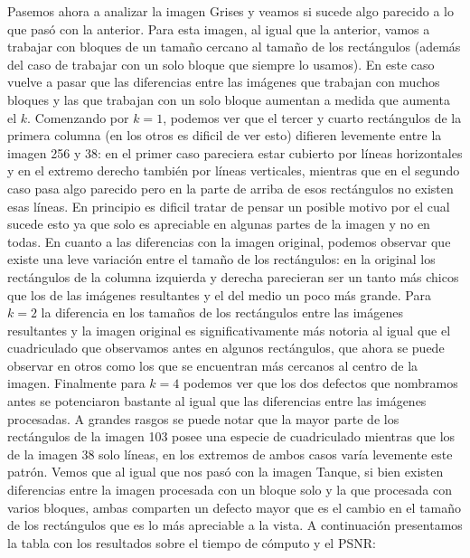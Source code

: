\documentclass[a4paper]{article}
\newcounter{col}
\begin{document}
Pasemos ahora a analizar la imagen Grises y veamos si sucede algo parecido a lo que pasó con la anterior. Para esta imagen, al igual que la anterior, vamos a trabajar con bloques de un tamaño cercano al tamaño de los rectángulos (además del caso de trabajar con un solo bloque que siempre lo usamos). En este caso vuelve a pasar que las diferencias entre las imágenes que trabajan con muchos bloques y las que trabajan con un solo bloque aumentan a medida que aumenta el $k$. Comenzando por $k = 1$, podemos ver que el tercer y cuarto rectángulos de la primera columna (en los otros es dificil de ver esto) difieren levemente entre la imagen 256 y 38: en el primer caso pareciera estar cubierto por líneas horizontales y en el extremo derecho también por líneas verticales, mientras que en el segundo caso pasa algo parecido pero en la parte de arriba de esos rectángulos no existen esas líneas. En principio es dificil tratar de pensar un posible motivo por el cual sucede esto ya que solo es apreciable en algunas partes de la imagen y no en todas. En cuanto a las diferencias con la imagen original, podemos observar que existe una leve variación entre el tamaño de los rectángulos: en la original los rectángulos de la columna izquierda y derecha parecieran ser un tanto más chicos que los de las imágenes resultantes y el del medio un poco más grande. Para $k = 2$ la diferencia en los tamaños de los rectángulos entre las imágenes resultantes y la imagen original es significativamente más notoria al igual que el cuadriculado que observamos antes en algunos rectángulos, que ahora se puede observar en otros como los que se encuentran más cercanos al centro de la imagen. Finalmente para $k = 4$ podemos ver que los dos defectos que nombramos antes se potenciaron bastante al igual que las diferencias entre las imágenes procesadas. A grandes rasgos se puede notar que la mayor parte de los rectángulos de la imagen 103 posee una especie de cuadriculado mientras que los de la imagen 38 solo líneas, en los extremos de ambos casos varía levemente este patrón. Vemos que al igual que nos pasó con la imagen Tanque, si bien existen diferencias entre la imagen procesada con un bloque solo y la que procesada con varios bloques, ambas comparten un defecto mayor que es el cambio en el tamaño de los rectángulos que es lo más apreciable a la vista. 
\noindent A continuación presentamos la tabla con los resultados sobre el tiempo de cómputo y el PSNR:
\newline
\end{document}
